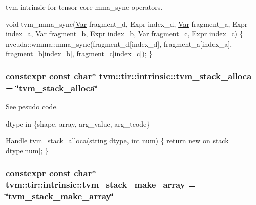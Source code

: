 tvm intrinsic for tensor core mma\+\_\+sync operators. 

void tvm\+\_\+mma\+\_\+sync(\hyperlink{classtvm_1_1tir_1_1Var}{Var} fragment\+\_\+d, Expr index\+\_\+d, \hyperlink{classtvm_1_1tir_1_1Var}{Var} fragment\+\_\+a, Expr index\+\_\+a, \hyperlink{classtvm_1_1tir_1_1Var}{Var} fragment\+\_\+b, Expr index\+\_\+b, \hyperlink{classtvm_1_1tir_1_1Var}{Var} fragment\+\_\+c, Expr index\+\_\+c) \{ nvcuda\+::wmma\+::mma\+\_\+sync(fragment\+\_\+d\mbox{[}index\+\_\+d\mbox{]}, fragment\+\_\+a\mbox{[}index\+\_\+a\mbox{]}, fragment\+\_\+b\mbox{[}index\+\_\+b\mbox{]}, fragment\+\_\+c\mbox{[}index\+\_\+c\mbox{]}); \} 
\subsubsection[{\texorpdfstring{tvm\+\_\+stack\+\_\+alloca}{tvm_stack_alloca}}]{\setlength{\rightskip}{0pt plus 5cm}constexpr const char$\ast$ tvm\+::tir\+::intrinsic\+::tvm\+\_\+stack\+\_\+alloca = \char`\"{}tvm\+\_\+stack\+\_\+alloca\char`\"{}}\hypertarget{namespacetvm_1_1tir_1_1intrinsic_a204b4be973bdf3e0c82f56a1273752bb}{}\label{namespacetvm_1_1tir_1_1intrinsic_a204b4be973bdf3e0c82f56a1273752bb}


See pesudo code. 

dtype in \{shape, array, arg\+\_\+value, arg\+\_\+tcode\}

Handle tvm\+\_\+stack\+\_\+alloca(string dtype, int num) \{ return new on stack dtype\mbox{[}num\mbox{]}; \} 
\subsubsection[{\texorpdfstring{tvm\+\_\+stack\+\_\+make\+\_\+array}{tvm_stack_make_array}}]{\setlength{\rightskip}{0pt plus 5cm}constexpr const char$\ast$ tvm\+::tir\+::intrinsic\+::tvm\+\_\+stack\+\_\+make\+\_\+array = \char`\"{}tvm\+\_\+stack\+\_\+make\+\_\+array\char`\"{}}\hypertarget{namespacetvm_1_1tir_1_1intrinsic_ab210d3708ad9206af139d76f29727ab4}{}\label{namespacetvm_1_1tir_1_1intrinsic_ab210d3708ad9206af139d76f29727ab4}


